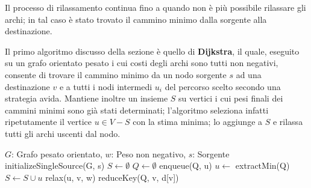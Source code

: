 \noindent Il processo di rilassamento continua fino a quando non è più possibile rilassare gli archi; in tal caso è stato trovato il cammino minimo
dalla sorgente alla destinazione.\par
Il primo algoritmo discusso della sezione è quello di \textbf{Dijkstra}, il quale, eseguito su un grafo orientato pesato i cui costi degli
archi sono tutti non negativi, consente di trovare il cammino minimo da un nodo sorgente $s$ ad una destinazione $v$ e a tutti i nodi intermedi $u_i$
del percorso scelto secondo una strategia avida. Mantiene inoltre un insieme $S$ su vertici i cui pesi finali dei cammini minimi sono già stati
determinati; l'algoritmo seleziona infatti ripetutamente il vertice $u\in V - S$ con la stima minima; lo aggiunge a $S$ e rilassa tutti gli archi
uscenti dal nodo.
\begin{algorithm}[h]
	\caption{dijkstra(G, w, s)}
	\begin{algorithmic}[i]
		\Require $G$: Grafo pesato orientato, $w$: Peso non negativo, $s$: Sorgente
		\State initializeSingleSource(G, s)
		\State $S\gets \emptyset$
		\State $Q\gets \emptyset$
		\State
		 
		\State enqueue(Q, u)
		\EndFor
		\State
		 
		\State $u\gets$ extractMin(Q) 
		\State $S\gets S\cup {u}$ 
		 
		\State relax(u, v, w)
		 
		\State reduceKey(Q, v, d[v]) 
		\EndIf
		\EndFor
		\EndWhile
	\end{algorithmic}
\end{algorithm}


